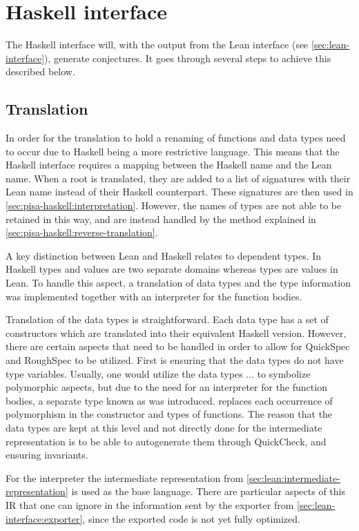 \section{Haskell interface}\label{sec:pisa-haskell}
The Haskell interface will, with the output from the Lean interface (see \cref{sec:lean-interface}), generate conjectures.
It goes through several steps to achieve this described below.

\subsection{Translation}\label{sec:pisa-haskell:translation}
In order for the translation to hold a renaming of functions and data types need to occur due to Haskell being a more restrictive language.
This means that the Haskell interface requires a mapping between the Haskell name and the Lean name.
When a root is translated, they are added to a list of signatures with their Lean name instead of their Haskell counterpart.
These signatures are then used in \cref{sec:pisa-haskell:interpretation}.
However, the names of types are not able to be retained in this way, and are instead handled by the method explained in \cref{sec:pisa-haskell:reverse-translation}.

A key distinction between Lean and Haskell relates to dependent types.
In Haskell types and values are two separate domains whereas types are values in Lean.
To handle this aspect, a translation of data types and the type information was implemented together with an interpreter for the function bodies.

Translation of the data types is straightforward.
Each data type has a set of constructors which are translated into their equivalent Haskell version.
However, there are certain aspects that need to be handled in order to allow for QuickSpec and RoughSpec to be utilized.
First is ensuring that the data types do not have type variables.
Usually, one would utilize the data types  ...  to symbolize polymorphic aspects, but due to the need for an interpreter for the function bodies, a separate type known as  was introduced.
 replaces each occurrence of polymorphism in the constructor and types of functions.
The reason that the data types are kept at this level and not directly done for the intermediate representation is to be able to autogenerate them through QuickCheck, and ensuring invariants.

For the interpreter the intermediate representation from \cref{sec:lean:intermediate-representation} is used as the base language.
There are particular aspects of this IR that one can ignore in the information sent by the exporter from \cref{sec:lean-interface:exporter}, since the exported code is not yet fully optimized.

